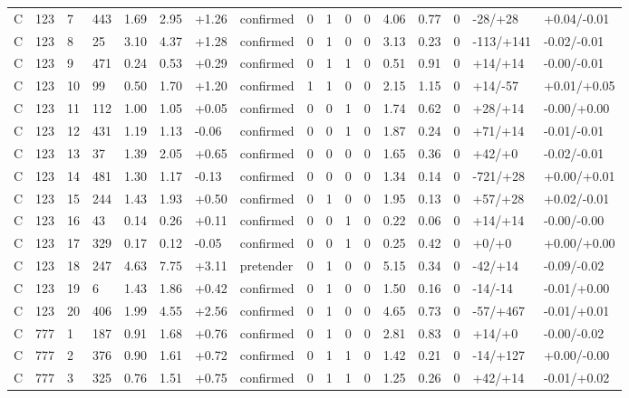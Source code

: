 \documentclass[11pt,a4paper]{article}
\begin{document}
{\begin{longtable}[]{@{}lllllllllllllllll@{}}
C & 123 & 7 & 443 & 1.69 & 2.95 & +1.26 & confirmed & 0 & 1 & 0 & 0 & 4.06 & 0.77 & 0 & -28/+28 & +0.04/-0.01 \\
C & 123 & 8 & 25 & 3.10 & 4.37 & +1.28 & confirmed & 0 & 1 & 0 & 0 & 3.13 & 0.23 & 0 & -113/+141 & -0.02/-0.01 \\
C & 123 & 9 & 471 & 0.24 & 0.53 & +0.29 & confirmed & 0 & 1 & 1 & 0 & 0.51 & 0.91 & 0 & +14/+14 & -0.00/-0.01 \\
C & 123 & 10 & 99 & 0.50 & 1.70 & +1.20 & confirmed & 1 & 1 & 0 & 0 & 2.15 & 1.15 & 0 & +14/-57 & +0.01/+0.05 \\
C & 123 & 11 & 112 & 1.00 & 1.05 & +0.05 & confirmed & 0 & 0 & 1 & 0 & 1.74 & 0.62 & 0 & +28/+14 & -0.00/+0.00 \\
C & 123 & 12 & 431 & 1.19 & 1.13 & -0.06 & confirmed & 0 & 0 & 1 & 0 & 1.87 & 0.24 & 0 & +71/+14 & -0.01/-0.01 \\
C & 123 & 13 & 37 & 1.39 & 2.05 & +0.65 & confirmed & 0 & 0 & 0 & 0 & 1.65 & 0.36 & 0 & +42/+0 & -0.02/-0.01 \\
C & 123 & 14 & 481 & 1.30 & 1.17 & -0.13 & confirmed & 0 & 0 & 0 & 0 & 1.34 & 0.14 & 0 & -721/+28 & +0.00/+0.01 \\
C & 123 & 15 & 244 & 1.43 & 1.93 & +0.50 & confirmed & 0 & 1 & 0 & 0 & 1.95 & 0.13 & 0 & +57/+28 & +0.02/-0.01 \\
C & 123 & 16 & 43 & 0.14 & 0.26 & +0.11 & confirmed & 0 & 0 & 1 & 0 & 0.22 & 0.06 & 0 & +14/+14 & -0.00/-0.00 \\
C & 123 & 17 & 329 & 0.17 & 0.12 & -0.05 & confirmed & 0 & 0 & 1 & 0 & 0.25 & 0.42 & 0 & +0/+0 & +0.00/+0.00 \\
C & 123 & 18 & 247 & 4.63 & 7.75 & +3.11 & pretender & 0 & 1 & 0 & 0 & 5.15 & 0.34 & 0 & -42/+14 & -0.09/-0.02 \\
C & 123 & 19 & 6 & 1.43 & 1.86 & +0.42 & confirmed & 0 & 1 & 0 & 0 & 1.50 & 0.16 & 0 & -14/-14 & -0.01/+0.00 \\
C & 123 & 20 & 406 & 1.99 & 4.55 & +2.56 & confirmed & 0 & 1 & 0 & 0 & 4.65 & 0.73 & 0 & -57/+467 & -0.01/+0.01 \\
C & 777 & 1 & 187 & 0.91 & 1.68 & +0.76 & confirmed & 0 & 1 & 0 & 0 & 2.81 & 0.83 & 0 & +14/+0 & -0.00/-0.02 \\
C & 777 & 2 & 376 & 0.90 & 1.61 & +0.72 & confirmed & 0 & 1 & 1 & 0 & 1.42 & 0.21 & 0 & -14/+127 & +0.00/-0.00 \\
C & 777 & 3 & 325 & 0.76 & 1.51 & +0.75 & confirmed & 0 & 1 & 1 & 0 & 1.25 & 0.26 & 0 & +42/+14 & -0.01/+0.02 \\

\end{longtable}}
\end{document}
